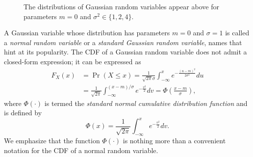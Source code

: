 \begin{figure}[ht]
\begin{center}
\end{center}
\caption{The distributions of Gaussian random variables appear above for parameters $m = 0$ and $\sigma^2 \in \{ 1, 2, 4 \}$.}
\end{figure}

A Gaussian variable whose distribution has parameters $m = 0$ and $\sigma = 1$ is called a \emph{normal random variable} or a \emph{standard Gaussian random variable}, names that hint at its popularity. 
The CDF of a Gaussian random variable does not admit a closed-form expression; it can be expressed as
\begin{equation*}
\begin{split}
F_X (x) &= \Pr (X \leq x)
= \frac{1}{\sqrt{2 \pi} \sigma}
\int_{- \infty}^{x} e^{- \frac{(u - m)^2}{2 \sigma^2}} du \\
&= \frac{1}{\sqrt{2 \pi}}
\int_{- \infty}^{(x - m)/\sigma} e^{- \frac{v^2}{2}} dv
= \Phi \left( \frac{x - m}{\sigma} \right),
\end{split}
\end{equation*}
where $\Phi (\cdot)$ is termed the \emph{standard normal cumulative distribution function} and is defined by
\begin{equation*}
\Phi (x) = 
\frac{1}{\sqrt{2 \pi}} \int_{-\infty}^x e^{-\frac{v^2}{2}} dv .
\end{equation*}
We emphasize that the function $\Phi (\cdot)$ is nothing more than a convenient notation for the CDF of a normal random variable.

